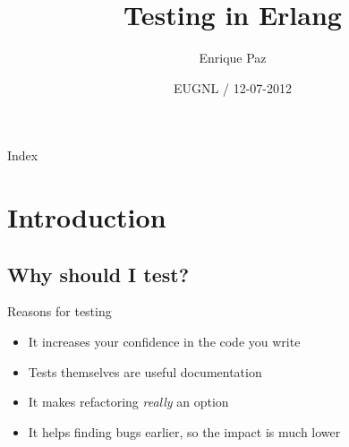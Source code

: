 \documentclass[pdf]{beamer}
\title[]{Testing in Erlang}
\author[] %
{Enrique Paz}
\institute[] %
{Senior Backend Developer @ Team Services}
\date[] %
{EUGNL / 12-07-2012}
\begin{document}
\begin{frame}
  \titlepage
\end{frame}

\begin{frame}{Index}
  \tableofcontents
\end{frame}

\section{Introduction}

\subsection*{Why should I test?}
\label{why_should_i_test}

\begin{frame}{Reasons for testing}
    \begin{itemize}
    \item It increases your confidence in the code you write
    \pause
    \item Tests themselves are useful documentation
    \pause
    \item It makes refactoring \emph{really} an option
    \pause
    \item It helps finding bugs earlier, so the impact is much lower
    \end{itemize}
\end{frame}
\end{document}
